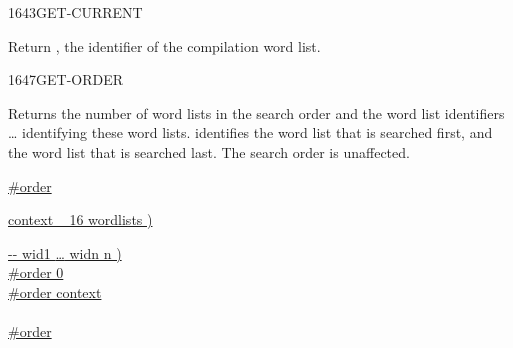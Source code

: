\begin{worddef}{1643}{GET-CURRENT}
\item {}

	Return , the identifier of the compilation word list.
\end{worddef}


\begin{worddef}{1647}{GET-ORDER}
\item {}

	Returns the number of word lists  in the search order
	and the word list identifiers  {\ldots} 
	identifying these word lists.  identifies the word
	list that is searched first, and  the word list that
	is searched last. The search order is unaffected.

	\begin{implement}
\cbstart{}
		\uline{}

		\uline{ \#order}

		\uline{ context  ~ 16  wordlists )  }

		\uline{\word{:}   -{}- wid1 {\ldots} widn n )} \\
		\tab \uline{\#order  0 } \\
		\tab[2] \uline{\#order   \word{-}   context \word{+} } \\
		\tab \uline{} \\
		\tab \uline{\#order } \\
		\uline{\word{;}}
\cbend
	\end{implement}
\end{worddef}


